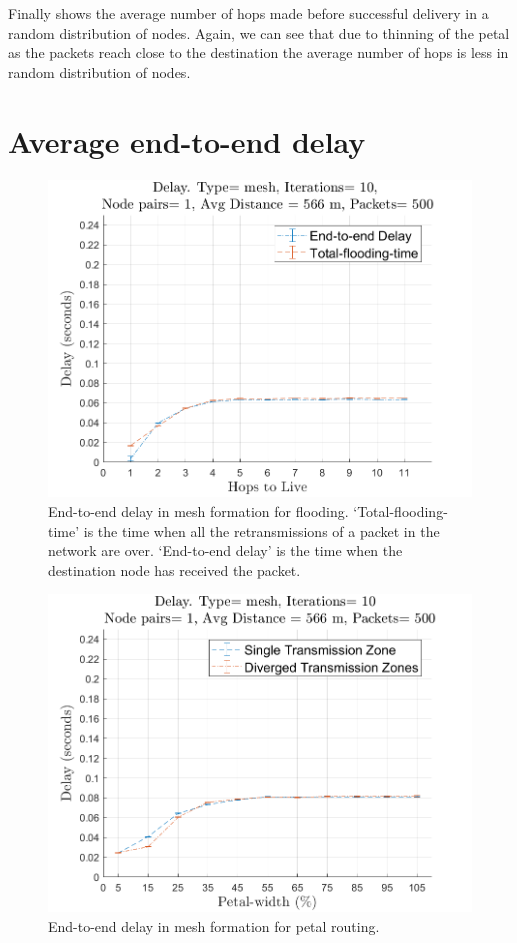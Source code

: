 Finally  shows the average number of hops made before successful delivery in a random distribution of nodes. Again, we can see that due to thinning of the petal as the packets reach close to the destination the average number of hops is less in random distribution of nodes.

\section{Average end-to-end delay}

\begin{figure}[hbtp]
\centering
\includegraphics[width=\simResultFigSize\textwidth]{ncsuthesis-0.6/Chapter-5/figs/fl_delay_mesh.png}
\caption{End-to-end delay in mesh formation for flooding. `Total-flooding-time' is the time when all the retransmissions of a packet in the network are over. `End-to-end delay' is the time when the destination node has received the packet.}
\label{fig:fl_delay_mesh}
\end{figure}

\begin{figure}[hbtp]
\centering
\includegraphics[width=\simResultFigSize\textwidth]{ncsuthesis-0.6/Chapter-5/figs/pe_delay_mesh.png}
\caption{End-to-end delay in mesh formation for petal routing.}
\label{fig:pe_delay_mesh}
\end{figure}


